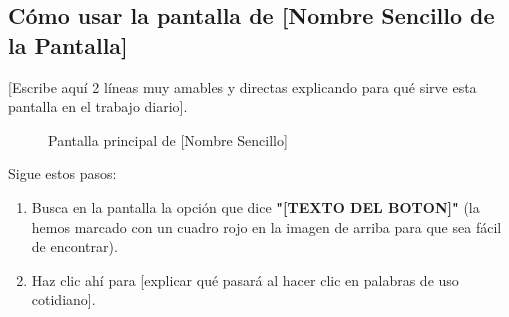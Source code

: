\subsection{Cómo usar la pantalla de [Nombre Sencillo de la Pantalla]}
[Escribe aquí 2 líneas muy amables y directas explicando para qué sirve esta pantalla en el trabajo diario].

\begin{figure}[H]
    \centering
    \caption{Pantalla principal de [Nombre Sencillo]}
\end{figure}

Sigue estos pasos:
\begin{enumerate}
    \item Busca en la pantalla la opción que dice \textbf{"[TEXTO DEL BOTON]"} (la hemos marcado con un cuadro rojo en la imagen de arriba para que sea fácil de encontrar).
    \item Haz clic ahí para [explicar qué pasará al hacer clic en palabras de uso cotidiano].
\end{enumerate}
